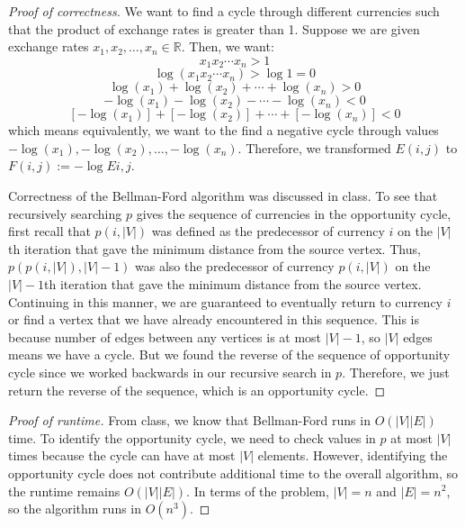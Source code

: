 \documentclass{article}
\begin{document}
\begin{proof}[Proof of correctness]
We want to find a cycle through different currencies such that the product of exchange rates is greater than 1. Suppose we are given exchange rates $x_1, x_2,\dots,x_n \in \mathbb{R}$. Then, we want:
$$ x_1 x_2 \cdots x_n > 1 $$
$$ \log (x_1 x_2 \cdots x_n) > \log 1=0 $$
$$ \log(x_1) + \log(x_2) + \cdots + \log(x_n) > 0$$
$$ -\log(x_1)- \log(x_2) - \cdots - \log(x_n) < 0$$
$$ [-\log(x_1)]+[- \log(x_2)]+\cdots +[- \log(x_n)] < 0$$
which means equivalently, we want to the find a negative cycle through values $-\log(x_1), - \log(x_2), \dots ,- \log(x_n)$. Therefore, we transformed $E(i,j)$ to $F(i,j):=-\log E{i,j}$.

Correctness of the Bellman-Ford algorithm was discussed in class. To see that recursively searching $p$ gives the sequence of currencies in the opportunity cycle, first recall that $p(i,|V|)$ was defined as the predecessor of currency $i$ on the $|V|$th iteration that gave the minimum distance from the source vertex. Thus, $p(p(i,|V|),|V|-1)$ was also the predecessor of currency $p(i,|V|)$ on the $|V|-1$th iteration that gave the minimum distance from the source vertex. Continuing in this manner, we are guaranteed to eventually return to currency $i$ or find a vertex that we have already encountered in this sequence. This is because number of edges between any vertices is at most $|V|-1$, so $|V|$ edges means we have a cycle. But we found the reverse of the sequence of opportunity cycle since we worked backwards in our recursive search in $p$. Therefore, we just return the reverse of the sequence, which is an opportunity cycle.
\end{proof}

\begin{proof}[Proof of runtime]
From class, we know that Bellman-Ford runs in $O(|V||E|)$ time. To identify the opportunity cycle, we need to check values in $p$ at most $|V|$ times because the cycle can have at most $|V|$ elements. However, identifying the opportunity cycle does not contribute additional time to the overall algorithm, so the runtime remains $O(|V||E|)$. In terms of the problem, $|V|=n$ and $|E|=n^2$, so the algorithm runs in $O(n^3)$.
\end{proof}
\end{document}
